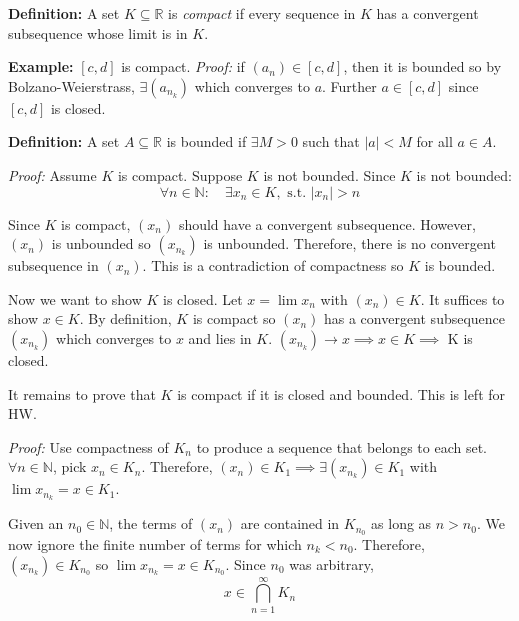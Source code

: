 \documentclass[12pt]{report}
\newcommand{\R}{\mathbb{R}}
\newcommand{\N}{\mathbb{N}}
\newcommand{\abs}[1]{\left\vert #1 \right\vert}
\newcommand{\st}{\text{ s.t. }}
\newenvironment*{tbox}[2][gray]{
    \begin{tcolorbox}[
        parbox=false,
        colback=#1!5!white,
        colframe=#1!75!black,
        breakable,
        title={#2}
    ]}
    {\end{tcolorbox}}
\begin{document}
    \textbf{Definition:} A set $K \subseteq \R$ is \emph{compact} if every sequence in $K$ has a convergent subsequence whose limit is in $K$.

    \textbf{Example:} $[c, d]$ is compact. \emph{Proof:} if $(a_n) \in [c, d]$, then it is bounded so by Bolzano-Weierstrass, $\exists (a_{n_k})$ which converges to $a$. Further $a \in [c, d]$ since $[c, d]$ is closed.

    \textbf{Definition:} A set $A \subseteq \R$ is bounded if $\exists M > 0$ such that $\abs{a} < M$ for all $a \in A$. 

    \begin{tbox}{\textbf{Theorem (Characterization of compactness in $\R$):} A set $K \subseteq \R$ is compact iff it is closed and bounded}
        \emph{Proof:} Assume $K$ is compact. Suppose $K$ is not bounded. Since $K$ is not bounded: 
        \[\forall n \in \N: \quad \exists x_n \in K, \st \abs{x_n} > n\]

        Since $K$ is compact, $(x_n)$ should have a convergent subsequence. However, $(x_n)$ is unbounded so $(x_{n_k})$ is unbounded. Therefore, there is no convergent subsequence in $(x_n)$. This is a contradiction of compactness so $K$ is bounded.

        Now we want to show $K$ is closed. Let $x = \lim x_n$ with $(x_n) \in K$. It suffices to show $x \in K$. By definition, $K$ is compact so $(x_n)$ has a convergent subsequence $(x_{n_k})$ which converges to $x$ and lies in $K$. $(x_{n_k}) \to x \implies x \in K \implies$ K is closed. 

        It remains to prove that $K$ is compact if it is closed and bounded. This is left for HW. 
    \end{tbox}

    \begin{tbox}{\textbf{Theorem (Nested Compact Set Property):} If $K_1 \supseteq K_2 \supseteq K_3 \supseteq \dots$ is a nested sequence of nonempty compact sets, then $\bigcap_{n=1}^{\infty} K_n \neq \emptyset$}
        \emph{Proof:} Use compactness of $K_n$ to produce a sequence that belongs to each set. $\forall n \in \N$, pick $x_n \in K_n$. Therefore, $(x_n) \in K_1 \implies \exists (x_{n_k}) \in K_1$ with $\lim x_{n_k} = x \in K_1$. 

        Given an $n_0 \in \N$, the terms of $(x_n)$ are contained in $K_{n_0}$ as long as $n > n_0$. We now ignore the finite number of terms for which $n_k < n_0$. Therefore, $(x_{n_k}) \in K_{n_0}$ so $\lim x_{n_k} = x \in K_{n_0}$. Since $n_0$ was arbitrary, 
        \[x \in \bigcap_{n=1}^{\infty} K_n\]
    \end{tbox}
\end{document}
